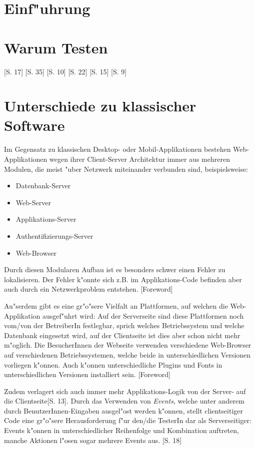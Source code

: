 \documentclass[a4paper,bibtotoc,oneside]{scrbook}
\begin{document}
\chapter{Einf"uhrung}

\chapter{Warum Testen}
\cite{eval_automat_webapp_test}[S. 17]
\cite{eval_automat_webapp_test}[S. 35]
\cite{test_large_systems}[S. 10]
\cite{test_auto}[S. 22]
\cite{betrieb}[S. 15]
\cite{eval_regression}[S. 9]

\chapter{Unterschiede zu klassischer Software}
Im Gegensatz zu klassischen Desktop- oder Mobil-Applikationen bestehen Web-Applikationen wegen ihrer Client-Server Architektur immer aus mehreren Modulen, die meist "uber Netzwerk miteinander verbunden sind, beispielsweise: 

\begin{itemize}
\item Datenbank-Server
\item Web-Server
\item Applikations-Server
\item Authentifizierungs-Server
\item Web-Browser
\end{itemize}

Durch diesen Modularen Aufbau ist es besonders schwer einen Fehler zu lokalisieren. Der Fehler k"onnte sich z.B. im Applikations-Code befinden aber auch durch ein Netzwerkproblem entstehen. \cite{testing_apps_on_web}[Foreword]

Au"serdem gibt es eine gr"o"sere Vielfalt an Plattformen, auf welchen die Web-Applikation ausgef"uhrt wird: Auf der Serverseite sind diese Plattformen noch vom/von der BetreiberIn festlegbar, sprich welches Betriebssystem und welche Datenbank eingesetzt wird, auf der Clientseite ist dies aber schon nicht mehr m"oglich. Die BesucherInnen der Webseite verwenden verschiedene Web-Browser auf verschiedenen Betriebssystemen, welche beide in unterschiedlichen Versionen vorliegen k"onnen. Auch k"onnen unterschiedliche Plugins und Fonts in unterschiedlichen Versionen installiert sein. \cite{testing_apps_on_web}[Foreword]

Zudem verlagert sich auch immer mehr Applikations-Logik von der Server- auf die Clientseite\cite{testing_apps_on_web}[S. 13]. Durch das Verwenden von \emph{Events}, welche unter anderem durch BenutzerInnen-Eingaben ausgel"ost werden k"onnen, stellt clientseitiger Code eine gr"o"sere Herausforderung f"ur den/die TesterIn dar als Serverseitiger: Events k"onnen in unterschiedlicher Reihenfolge und Kombination auftreten, manche Aktionen l"osen sogar mehrere Events aus. \cite{testing_apps_on_web}[S. 18]
\end{document}
